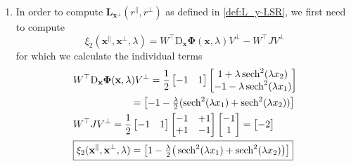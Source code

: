 \documentclass[letterpaper, 10 pt, conference, dvipsnames]{ieeeconf}
\begin{document}
\begin{enumerate}
\begin{align*}
          \end{align*}
          yielding \(\xi_1(\mathbf{x}^{\parallel},\lambda) = \begin{bmatrix}0&0\end{bmatrix}\implies\boxed{\mathbf{L}_{(\mathbf{x}^\parallel,\lambda)}(r^\parallel) = 0}\)
    \item In order to compute \(\mathbf{L}_{\mathbf{x}^\perp}(r^\parallel,r^\perp)\) as defined in \eqref{def:L_y-LSR}, we first need to compute
          \begin{equation*}
              \xi_2(\mathbf{x}^{\parallel}, \mathbf{x}^{\perp},\lambda) = W^\top\mathrm{D}_{\mathbf{x}} \mathbf{\Phi}(\mathbf{x},\lambda) V^{\perp} - W^\top J V^{\perp}
          \end{equation*}
          for which we calculate the individual terms
          \[\small
              \begin{aligned}
                   & W^\top\mathrm{D}_{\mathbf{x}} \mathbf{\Phi}(\mathbf{x},\lambda) V^{\perp} = \frac12\begin{bmatrix}-1&1\end{bmatrix}\begin{bmatrix}1+\lambda\sech^2(\lambda x_2)\\-1-\lambda\sech^2(\lambda x_1)\end{bmatrix} \\
                   & \qquad\qquad\quad\;\;\; = \begin{bmatrix}-1-\frac{\lambda}{2}(\sech^2(\lambda x_1)+\sech^2(\lambda x_2))\end{bmatrix}                                                                                        \\
                   & W^\top J V^{\perp} = \frac12\begin{bmatrix}-1&1\end{bmatrix}\begin{bmatrix}-1&+1\\+1&-1\end{bmatrix}\begin{bmatrix}-1\\1\end{bmatrix} = \begin{bmatrix}-2\end{bmatrix}                                       \\
                   & \boxed{\xi_2(\mathbf{x}^{\parallel}, \mathbf{x}^{\perp},\lambda) = \begin{bmatrix}1-\frac{\lambda}{2}\big(\sech^2(\lambda x_1)+\sech^2(\lambda x_2)\big)\end{bmatrix}}

\end{aligned}\]
\end{enumerate}
\end{document}
